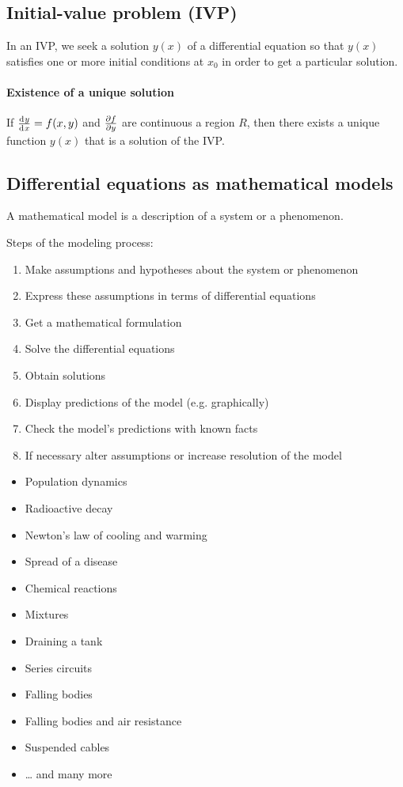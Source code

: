 \documentclass[10pt, twocolumn]{article}
\theoremstyle{definition}
\begin{document}
\subsection{Initial-value problem (IVP)}
In an IVP, we seek a solution \(y(x)\) of a differential equation so that \(y(x)\) satisfies one or more initial conditions at \(x_0 \) in order to get a particular solution.

\vspace{-10pt}
\paragraph*{Existence of a unique solution}
If \(\frac{\mathrm{d}^{} y}{\mathrm{d}^{} x} = f(x,y)\) and \(\frac{\partial f}{\partial y}\) are continuous a region \(R\), then there exists a unique function \(y(x)\) that is a solution of the IVP.


\subsection{Differential equations as mathematical models}
A mathematical model is a description of a system or a phenomenon.

Steps of the modeling process:
\begin{enumerate}
  \item Make assumptions and hypotheses about the system or phenomenon
  \item Express these assumptions in terms of differential equations
  \item Get a mathematical formulation
  \item Solve the differential equations
  \item Obtain solutions
  \item Display predictions of the model (e.g. graphically)
  \item Check the model's predictions with known facts
  \item If necessary alter assumptions or increase resolution of the model
\end{enumerate}

\begin{example}
  \begin{itemize}
    \item Population dynamics
    \item Radioactive decay
    \item Newton's law of cooling and warming
    \item Spread of a disease
    \item Chemical reactions
    \item Mixtures
    \item Draining a tank
    \item Series circuits
    \item Falling bodies
    \item Falling bodies and air resistance
    \item Suspended cables
    \item \dots{} and many more
  \end{itemize}
\end{example}
\end{document}
